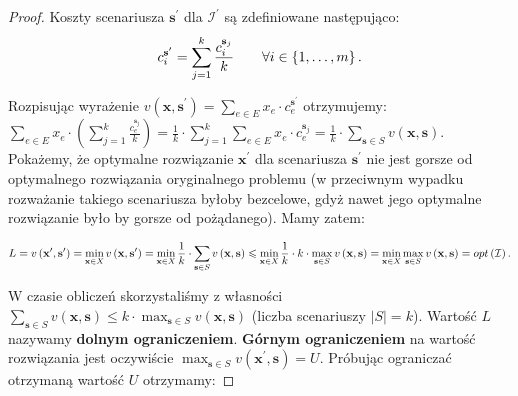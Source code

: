 \begin{proof}
	Koszty scenariusza $\textbf{s}^{\prime}$ dla $\mathcal{I}^{\prime}$ są zdefiniowane następująco:
	\begin{equation}
		c^{\textbf{s}^{\prime}}_{i} = \sum_{\mathclap{j = 1}}^{k} \frac{c_{i}^{\textbf{s}_{j}}}{k} \qquad \forall i \in \left\{ 1, \dots, m \right\}\text{.}
	\end{equation}
	
	Rozpisując wyrażenie $v \left( \textbf{x}, \textbf{s}^{\prime} \right) = \sum_{e \in E} x_{e} \cdot c^{\textbf{s}^{\prime}}_{e}$ otrzymujemy: $\sum_{e \in E} x_{e} \cdot \left( \sum_{j = 1}^{k} \frac{c_{e}^{\textbf{s}_{j}}}{k} \right) = \frac{1}{k} \cdot \sum_{j = 1}^{k} \sum_{e \in E} x_{e} \cdot c^{\textbf{s}_{j}}_{e} = \frac{1}{k} \cdot \sum_{\textbf{s} \in S} v \left( \textbf{x}, \textbf{s} \right)$. Pokażemy, że optymalne rozwiązanie $\textbf{x}^{\prime}$ dla scenariusza $\textbf{s}^{\prime}$ nie jest gorsze od optymalnego rozwiązania oryginalnego problemu (w przeciwnym wypadku rozważanie takiego scenariusza byłoby bezcelowe, gdyż nawet jego optymalne rozwiązanie było by gorsze od pożądanego). Mamy zatem:
	
	\begin{equation}
		L = v \left( \textbf{x}^{\prime}, \textbf{s}^{\prime} \right) = \min_{\mathclap{\textbf{x} \in X}} v \left( \textbf{x}, \textbf{s}^{\prime} \right) = \min_{ \mathclap{\textbf{x} \in X}} \frac{1}{k} \cdot \sum_{\textbf{s} \in S} v \left( \textbf{x}, \textbf{s} \right) \leqslant \min_{ \mathclap{\textbf{x} \in X}} \frac{1}{k} \cdot k \cdot \max_{\textbf{s} \in S} v \left( \textbf{x}, \textbf{s} \right) = \min_{ \mathclap{\textbf{x} \in X}} \max_{\textbf{s} \in S} v \left( \textbf{x}, \textbf{s} \right) = opt \left( \mathcal{I}\right)\text{.}
	\end{equation}
	
	W czasie obliczeń skorzystaliśmy z własności $\sum_{\textbf{s} \in S} v \left( \textbf{x}, \textbf{s} \right) \leqslant k \cdot \max_{\textbf{s} \in S} v \left( \textbf{x}, \textbf{s} \right)$ (liczba scenariuszy $\left| S \right| = k$). Wartość $L$ nazywamy \textbf{dolnym ograniczeniem}. \textbf{Górnym ograniczeniem} na wartość rozwiązania jest oczywiście $\max_{\textbf{s} \in S} v \left( \textbf{x}^{\prime}, \textbf{s} \right) = U$. Próbując ograniczać otrzymaną wartość $U$ otrzymamy:
	

\end{proof}
